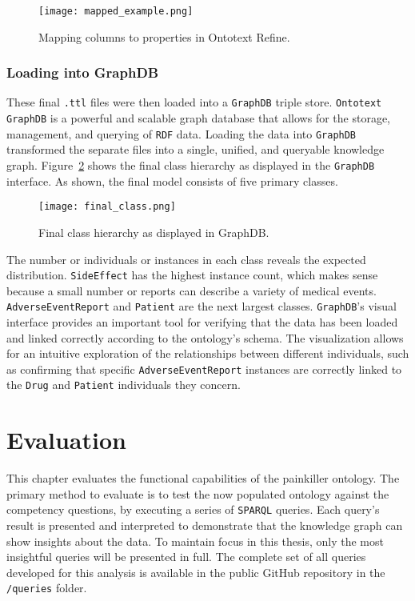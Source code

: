 \begin{figure}[H]
\centering
\texttt{[image: mapped\_example.png]} %
\caption{Mapping columns to properties in Ontotext Refine.}
\label{fig:mapping_process}
\end{figure}

\subsubsection*{Loading into GraphDB}
These final \texttt{.ttl} files were then loaded into a \texttt{GraphDB} triple store. \texttt{Ontotext GraphDB} is a powerful and scalable graph database that allows for the storage, management, and querying of \texttt{RDF} data. Loading the data into \texttt{GraphDB} transformed the separate files into a single, unified, and queryable knowledge graph. Figure~\ref{fig:graphdb_hierarchy} shows the final class hierarchy as displayed in the \texttt{GraphDB} interface. As shown, the final model consists of five primary classes.

\begin{figure}[H]
\centering
\texttt{[image: final\_class.png]} %
\caption{Final class hierarchy as displayed in GraphDB.}
\label{fig:graphdb_hierarchy}
\end{figure}

The number or individuals or instances in each class reveals the expected distribution. \texttt{Side\-Effect} has the highest instance count, which makes sense because a small number or reports can describe a variety of medical events. \texttt{Adverse\-Event\-Report} and \texttt{Patient} are the next largest classes.
\texttt{GraphDB}'s visual interface provides an important tool for verifying that the data has been loaded and linked correctly according to the ontology's schema. The visualization allows for an intuitive exploration of the relationships between different individuals, such as confirming that specific \texttt{Adverse\-Event\-Report} instances are correctly linked to the \texttt{Drug} and \texttt{Patient} individuals they concern.

\section{Evaluation}

This chapter evaluates the functional capabilities of the painkiller ontology. The primary method to evaluate is to test the now populated ontology against the competency questions, by executing a series of \texttt{SPARQL} queries. Each query's result is presented and interpreted to demonstrate that the knowledge graph can show insights about the data. 
To maintain focus in this thesis, only the most insightful queries will be presented in full. The complete set of all queries developed for this analysis is available in the public GitHub repository in the \texttt{/queries} folder.

